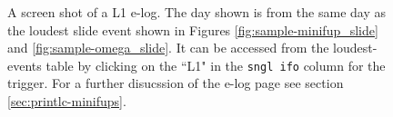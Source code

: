 \begin{figure}[p]
\label{fig:sample-elog-slide}
\center
{}
\caption{A screen shot of a L1 e-log. The day shown is from the same day as the
loudest slide event shown in Figures \ref{fig:sample-minifup_slide} and
\ref{fig:sample-omega_slide}. It can be accessed from the loudest-events table
by clicking on the ``L1" in the \texttt{sngl ifo} column for the trigger. For a
further disucssion of the e-log page see section \ref{sec:printlc-minifups}.}
\end{figure}

